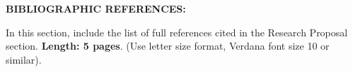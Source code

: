 \documentclass[demo, MAIN.tex]{subfiles}
\begin{document}
\noindent\textbf{BIBLIOGRAPHIC REFERENCES:}

\bigskip

\noindent In this section, include the list of full references cited
in the Research Proposal section. \textbf{Length: 5 pages}. (Use
letter size format, Verdana font size 10 or similar).

\ifSubfilesClassLoaded{%
  
}{%
  
}
\end{document}

